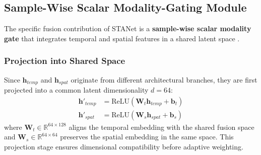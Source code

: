 \documentclass[journal]{IEEEtran}
\begin{document}
\begin{table}[!htbp]
  \centering
  \caption{Summary of GNN branch configuration}
  \label{tab:gnn_config}
  \renewcommand{\arraystretch}{1.15}
\end{table}

\subsection{Sample-Wise Scalar Modality-Gating Module}
The specific fusion contribution of STANet is a \textbf{sample-wise scalar modality gate} that integrates temporal and spatial features in a shared latent space \cite{zhao_starg2n_2025, pan_dc-stgcn_2021}.

\subsubsection{Projection into Shared Space}
Since $\mathbf{h}_{temp}$ and $\mathbf{h}_{spat}$ originate from different architectural branches, they are first projected into a common latent dimensionality $d = 64$:
\begin{align}
  \mathbf{h}'_{temp} &= \text{ReLU}(\mathbf{W}_t \mathbf{h}_{temp} + \mathbf{b}_t) \\
  \mathbf{h}'_{spat} &= \text{ReLU}(\mathbf{W}_s \mathbf{h}_{spat} + \mathbf{b}_s)
\end{align}
where $\mathbf{W}_t \in \mathbb{R}^{64 \times 128}$ aligns the temporal embedding with the shared fusion space and $\mathbf{W}_s \in \mathbb{R}^{64 \times 64}$ preserves the spatial embedding in the same space. This projection stage ensures dimensional compatibility before adaptive weighting.
\end{document}
